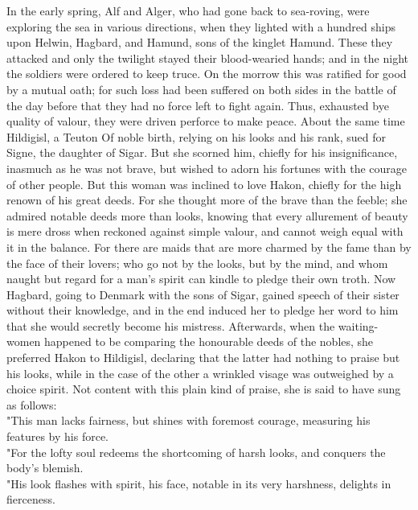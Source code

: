 \documentclass[10pt,a4paper]{report}
\begin{document}
In the early spring, Alf and Alger, who had gone back to sea-roving, were exploring the sea in various directions, when they lighted with a hundred ships upon Helwin, Hagbard, and Hamund, sons of the kinglet Hamund. These they attacked and only the twilight stayed their blood-wearied hands; and in the night the soldiers were ordered to keep truce. On the morrow this was ratified for good by a mutual oath; for such loss had been suffered on both sides in the battle of the day before that they had no force left to fight again. Thus, exhausted bye quality of valour, they were driven perforce to make peace. About the same time Hildigisl, a Teuton Of noble birth, relying on his looks and his rank, sued for Signe, the daughter of Sigar. But she scorned him, chiefly for his insignificance, inasmuch as he was not brave, but wished to adorn his fortunes with the courage of other people. But this woman was inclined to love Hakon, chiefly for the high renown of his great deeds. For she thought more of the brave than the feeble; she admired notable deeds more than looks, knowing that every allurement of beauty is mere dross when reckoned against simple valour, and cannot weigh equal with it in the balance. For there are maids that are more charmed by the fame than by the face of their lovers; who go not by the looks, but by the mind, and whom naught but regard for a man's spirit can kindle to pledge their own troth. Now Hagbard, going to Denmark with the sons of Sigar, gained speech of their sister without their knowledge, and in the end induced her to pledge her word to him that she would secretly become his mistress. Afterwards, when the waiting-women happened to be comparing the honourable deeds of the nobles, she preferred Hakon to Hildigisl, declaring that the latter had nothing to praise but his looks, while in the case of the other a wrinkled visage was outweighed by a choice spirit. Not content with this plain kind of praise, she is said to have sung as follows:\\

"This man lacks fairness, but shines with foremost courage, measuring his features by his force.\\

"For the lofty soul redeems the shortcoming of harsh looks, and conquers the body's blemish.\\

"His look flashes with spirit, his face, notable in its very harshness, delights in fierceness.\\
\end{document}

